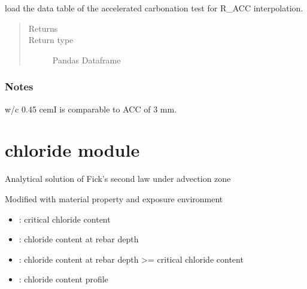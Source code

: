 \documentclass[letterpaper,10pt,english]{sphinxmanual}
\begin{document}

\begin{fulllineitems}
\label{\detokenize{carbonation:carbonation.load_df_R_ACC}}
\sphinxAtStartPar
load the data table of the accelerated carbonation test
for R\_ACC interpolation.
\begin{quote}\begin{description}
\item[{Returns}] \leavevmode
\sphinxAtStartPar


\item[{Return type}] \leavevmode
\sphinxAtStartPar
Pandas Dataframe

\end{description}\end{quote}
\subsubsection*{Notes}

\sphinxAtStartPar
w/c 0.45 cemI is comparable to ACC of 3 mm.

\end{fulllineitems}



\section{chloride module}
\label{\detokenize{chloride:module-chloride}}\label{\detokenize{chloride:chloride-module}}\label{\detokenize{chloride::doc}}
\sphinxAtStartPar
{}

\sphinxAtStartPar
Analytical solution of Fick’s second law under advection zone

\sphinxAtStartPar
Modified with material property and exposure environment
\begin{itemize}
\item {} 
\sphinxAtStartPar
{}:       critical chloride content

\item {} 
\sphinxAtStartPar
{}:             chloride content at rebar depth

\item {} 
\sphinxAtStartPar
{}:      chloride content at rebar depth \textgreater{}= critical chloride content

\item {} 
\sphinxAtStartPar
{}:       chloride content profile

\end{itemize}
\end{document}

